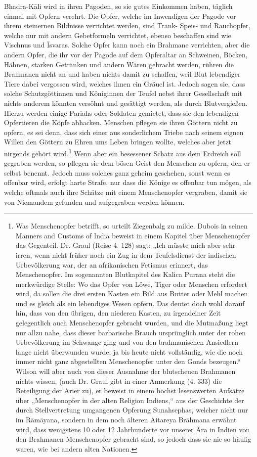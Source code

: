 \documentclass{article}
\begin{document}
Bhadra-K\={a}li wird in ihren Pagoden, so sie gutes Einkommen haben, täglich einmal mit Opfern verehrt. Die Opfer, welche im Inwendigen der Pagode vor ihrem steinernen Bildnisse verrichtet werden, sind Trank- Speis- und Rauchopfer, welche nur mit andern Gebetformeln verrichtet, ebenso beschaffen sind wie Vischnus und \={I}svaras. Solche Opfer kann noch ein Brahmane verrichten, aber die andern Opfer, die ihr vor der Pagode auf dem Opferaltar an Schweinen, Böcken, Hähnen, starken Getränken und andern Wären gebracht werden, rühren die Brahmanen nicht an und haben nichts damit zu schaffen, weil Blut lebendiger Tiere dabei vergossen wird, welches ihnen ein Gräuel ist. Jedoch sagen sie, dass solche Schutzgöttinnen und Königinnen der Teufel nebst ihrer Gesellschaft mit nichts anderem könnten versöhnt und gesättigt werden, als durch Blutvergießen. Hierzu werden einige Pariahs oder Soldaten gemietet, dass sie den lebendigen Opfertieren die Köpfe abhacken. Menschen pflegen sie ihren Göttern nicht zu opfern, es sei denn, dass sich einer aus sonderlichem Triebe nach seinem eignen Willen den Göttern zu Ehren ums Leben bringen wollte, welches aber jetzt nirgends gehört wird.\footnote{Was Menschenopfer betrifft, so urteilt Ziegenbalg zu milde. Dubois in seinen Manners and Customs of India beweist in einem Kapitel über Menschenopfer das Gegenteil. Dr. Graul (Reise 4. 128) sagt: „Ich müsste mich aber sehr irren, wenn nicht früher noch ein Zug in dem Teufelsdienst der indischen Urbevölkerung war, der an afrikanischen Fetismus erinnert, das Menschenopfer. Im sogenannten Blutkapitel des Kalica Purana steht die merkwürdige Stelle: Wo das Opfer von Löwe, Tiger oder Menschen erfordert wird, da sollen die drei ersten Kasten ein Bild aus Butter oder Mehl machen und es gleich als ein lebendiges Wesen opfern. Das deutet doch wohl darauf hin, dass von den übrigen, den niederen Kasten, zu irgendeiner Zeit gelegentlich auch Menschenopfer gebracht wurden, und die Mutmaßung liegt nur allzu nahe, dass dieser barbarische Brauch ursprünglich unter der rohen Urbevölkerung im Schwange ging und von den brahmanischen Ansiedlern lange nicht überwunden wurde, ja bis heute nicht vollständig, wie die noch immer nicht ganz abgestellten Menschenopfer unter den Gonds bezeugen.“ Wilson will aber auch von dieser Ausnahme der blutscheuen Brahmanen nichts wissen, (auch Dr. Graul gibt in einer Anmerkung (4. 333) die Beteiligung der Arier zu), er beweist in einem höchst lesenswerten Aufsätze über „Menschenopfer in der alten Religion Indiens,“ aus der Geschichte der durch Stellvertretung umgangenen Opferung Sunahsephas, welcher nicht nur im R\={a}m\={a}yana, sondern in dem noch älteren Aitareya Br\={a}hmana erwähnt wird, dass wenigstens 10 oder 12 Jahrhunderte vor unserer Ära in Indien von den Brahmanen Menschenopfer gebracht sind, so jedoch dass sie nie so häufig waren, wie bei andern alten Nationen.} Wenn aber ein besessener Schatz aus dem Erdreich soll gegraben werden, so pflegen sie dem bösen Geist den Menschen zu opfern, den er selbst benennt. Jedoch muss solches ganz geheim geschehen, sonst wenn es offenbar wird, erfolgt harte Strafe, nur dass die Könige es offenbar tun mögen, als welche oftmals auch ihre Schätze mit einem Menschenopfer vergraben, damit sie von Niemandem gefunden und aufgegraben werden können.
\end{document}

